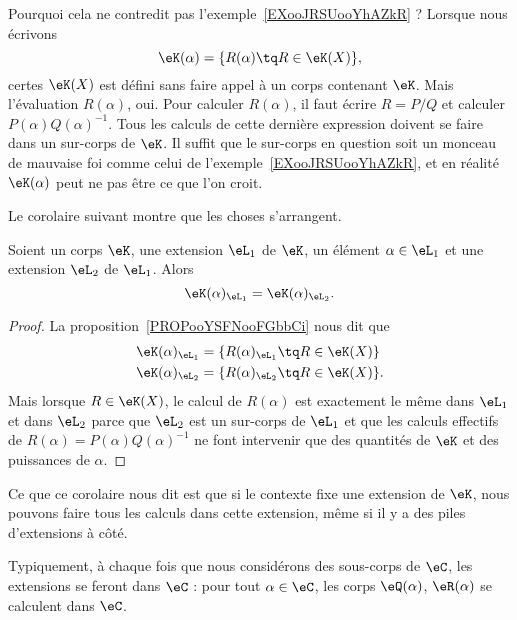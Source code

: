 Pourquoi cela ne contredit pas l'exemple~\ref{EXooJRSUooYhAZkR} ? Lorsque nous écrivons
\begin{equation}
	\eK(\alpha)=\{ R(\alpha)\tq R\in \eK(X) \},
\end{equation}
certes \( \eK(X)\) est défini sans faire appel à un corps contenant \( \eK\). Mais l'évaluation \( R(\alpha)\), oui. Pour calculer \( R(\alpha)\), il faut écrire \( R=P/Q\) et calculer \( P(\alpha)Q(\alpha)^{-1}\). Tous les calculs de cette dernière expression doivent se faire dans un sur-corps de \( \eK\). Il suffit que le sur-corps en question soit un monceau de mauvaise foi comme celui de l'exemple~\ref{EXooJRSUooYhAZkR}, et en réalité \( \eK(\alpha)\) peut ne pas être ce que l'on croit.

Le corolaire suivant montre que les choses s'arrangent.

\begin{corollary}
	Soient un corps \( \eK\), une extension \( \eL_1\) de \( \eK\), un élément \( \alpha\in \eL_1\) et une extension \( \eL_2\) de \( \eL_1\). Alors
	\begin{equation}
		\eK(\alpha)_{\eL_1}=\eK(\alpha)_{\eL_2}.
	\end{equation}
\end{corollary}

\begin{proof}
	La proposition~\ref{PROPooYSFNooFGbbCi} nous dit que
	\begin{subequations}
		\begin{align}
			\eK(\alpha)_{\eL_1} & =\{ R(\alpha)_{\eL_1}\tq R\in\eK(X) \}  \\
			\eK(\alpha)_{\eL_2} & =\{ R(\alpha)_{\eL_2}\tq R\in\eK(X) \}.
		\end{align}
	\end{subequations}
	Mais lorsque \( R\in \eK(X)\), le calcul de \( R(\alpha)\) est exactement le même dans \( \eL_1\) et dans \( \eL_2\) parce que \( \eL_2\) est un sur-corps de \( \eL_1\) et que les calculs effectifs de \( R(\alpha)=P(\alpha)Q(\alpha)^{-1}\) ne font intervenir que des quantités de \( \eK\) et des puissances de \( \alpha\).
\end{proof}

Ce que ce corolaire nous dit est que si le contexte fixe une extension de \( \eK\), nous pouvons faire tous les calculs dans cette extension, même si il y a des piles d'extensions à côté.

Typiquement, à chaque fois que nous considérons des sous-corps de \( \eC\), les extensions se feront dans \( \eC\) : pour tout \( \alpha\in \eC\), les corps \( \eQ(\alpha)\), \( \eR(\alpha)\) se calculent dans \( \eC\).


